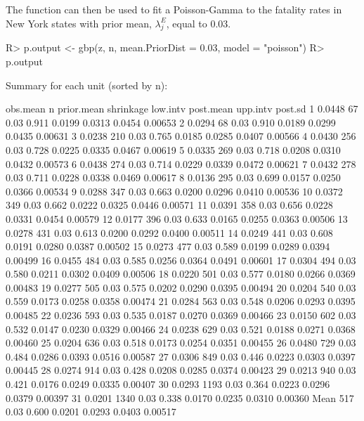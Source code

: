 \documentclass[article]{jss}
\begin{document}
The function  can then be used to fit a Poisson-Gamma to the fatality
rates in New York states with prior mean, $\lambda^E_j$, equal to 0.03.

\begin{CodeChunk}
\begin{CodeInput}
R> p.output <- gbp(z, n, mean.PriorDist = 0.03, model = "poisson")
R> p.output
\end{CodeInput}
\begin{CodeOutput}
Summary for each unit (sorted by n):

      obs.mean    n prior.mean shrinkage low.intv post.mean upp.intv post.sd
1       0.0448   67       0.03     0.911   0.0199    0.0313   0.0454 0.00653
2       0.0294   68       0.03     0.910   0.0189    0.0299   0.0435 0.00631
3       0.0238  210       0.03     0.765   0.0185    0.0285   0.0407 0.00566
4       0.0430  256       0.03     0.728   0.0225    0.0335   0.0467 0.00619
5       0.0335  269       0.03     0.718   0.0208    0.0310   0.0432 0.00573
6       0.0438  274       0.03     0.714   0.0229    0.0339   0.0472 0.00621
7       0.0432  278       0.03     0.711   0.0228    0.0338   0.0469 0.00617
8       0.0136  295       0.03     0.699   0.0157    0.0250   0.0366 0.00534
9       0.0288  347       0.03     0.663   0.0200    0.0296   0.0410 0.00536
10      0.0372  349       0.03     0.662   0.0222    0.0325   0.0446 0.00571
11      0.0391  358       0.03     0.656   0.0228    0.0331   0.0454 0.00579
12      0.0177  396       0.03     0.633   0.0165    0.0255   0.0363 0.00506
13      0.0278  431       0.03     0.613   0.0200    0.0292   0.0400 0.00511
14      0.0249  441       0.03     0.608   0.0191    0.0280   0.0387 0.00502
15      0.0273  477       0.03     0.589   0.0199    0.0289   0.0394 0.00499
16      0.0455  484       0.03     0.585   0.0256    0.0364   0.0491 0.00601
17      0.0304  494       0.03     0.580   0.0211    0.0302   0.0409 0.00506
18      0.0220  501       0.03     0.577   0.0180    0.0266   0.0369 0.00483
19      0.0277  505       0.03     0.575   0.0202    0.0290   0.0395 0.00494
20      0.0204  540       0.03     0.559   0.0173    0.0258   0.0358 0.00474
21      0.0284  563       0.03     0.548   0.0206    0.0293   0.0395 0.00485
22      0.0236  593       0.03     0.535   0.0187    0.0270   0.0369 0.00466
23      0.0150  602       0.03     0.532   0.0147    0.0230   0.0329 0.00466
24      0.0238  629       0.03     0.521   0.0188    0.0271   0.0368 0.00460
25      0.0204  636       0.03     0.518   0.0173    0.0254   0.0351 0.00455
26      0.0480  729       0.03     0.484   0.0286    0.0393   0.0516 0.00587
27      0.0306  849       0.03     0.446   0.0223    0.0303   0.0397 0.00445
28      0.0274  914       0.03     0.428   0.0208    0.0285   0.0374 0.00423
29      0.0213  940       0.03     0.421   0.0176    0.0249   0.0335 0.00407
30      0.0293 1193       0.03     0.364   0.0223    0.0296   0.0379 0.00397
31      0.0201 1340       0.03     0.338   0.0170    0.0235   0.0310 0.00360
Mean            517       0.03     0.600   0.0201    0.0293   0.0403 0.00517
\end{CodeOutput}
\end{CodeChunk}
\end{document}
